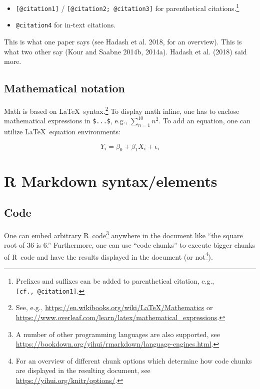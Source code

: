 \documentclass{article}
\begin{document}
\begin{itemize}
\tightlist
\item
  \texttt{{[}@citation1{]}} / \texttt{{[}@citation2;\ @citation3{]}} for parenthetical citations.\footnote{Prefixes and suffixes can be added to parenthetical citation, e.g., \texttt{{[}cf.,\ @citation1{]}}.}
\item
  \texttt{@citation4} for in-text citations.
\end{itemize}

This is what one paper says (see Hadash et al. 2018, for an overview). This is what two other say (Kour and Saabne 2014b, 2014a). Hadash et al. (2018) said more.

\hypertarget{mathematical-notation}{%
\subsection{Mathematical notation}\label{mathematical-notation}}

Math is based on \LaTeX~syntax.\footnote{See, e.g., \url{https://en.wikibooks.org/wiki/LaTeX/Mathematics} or \url{https://www.overleaf.com/learn/latex/mathematical_expressions}.} To display math inline, one has to enclose mathematical expressions in \texttt{\$...\$}, e.g., \(\sum_{n=1}^{10} n^2\). To add an equation, one can utilize \LaTeX~equation environments:

\begin{equation}
Y_i = \beta_0 + \beta_1 X_i + \epsilon_i
\label{eq:regression}
\end{equation}

\hypertarget{r-markdown-syntaxelements}{%
\section{R Markdown syntax/elements}\label{r-markdown-syntaxelements}}

\hypertarget{code}{%
\subsection{Code}\label{code}}

One can embed arbitrary \textsf{R}~code\footnote{A number of other programming languages are also supported, see \url{https://bookdown.org/yihui/rmarkdown/language-engines.html}.} anywhere in the document like ``the square root of 36 is 6.'' Furthermore, one can use ``code chunks'' to execute bigger chunks of \textsf{R}~code and have the results displayed in the document (or not\footnote{For an overview of different chunk options which determine how code chunks are displayed in the resulting document, see \url{https://yihui.org/knitr/options/}.}).
\end{document}

